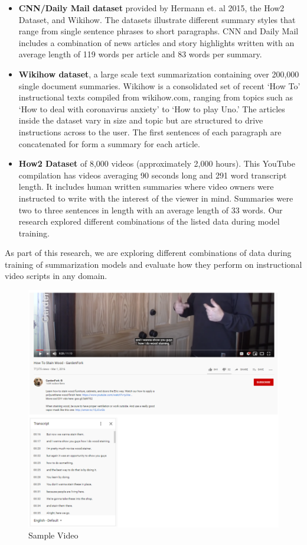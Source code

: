 \documentclass{article}
\begin{document}
\begin{itemize}

\item \textbf{CNN/Daily Mail dataset} provided by Hermann et. al 2015, the How2 Dataset, and Wikihow. The datasets illustrate different summary styles that range from single sentence phrases to short paragraphs. CNN and Daily Mail includes a combination of news articles and story highlights written with an average length of 119 words per article and 83 words per summary.
\item \textbf{Wikihow dataset}, a large scale text summarization containing over 200,000 single document summaries. Wikihow is a consolidated set of recent ‘How To’ instructional texts compiled from wikihow.com, ranging from topics such as ‘How to deal with coronavirus anxiety’ to ‘How to play Uno.’ The articles inside the dataset vary in size and topic but are structured to drive instructions across to the user. The first sentences of each paragraph are concatenated for form a summary for each article. 
\item \textbf{How2 Dataset} of 8,000 videos (approximately 2,000 hours). This YouTube compilation has videos averaging 90 seconds long and 291 word transcript length. It includes human written summaries where video owners were instructed to write with the interest of the viewer in mind. Summaries were two to three sentences in length with an average length of 33 words. 
Our research explored different combinations of the listed data during model training. 

\end{itemize}

As part of this research, we are exploring different combinations of data during training of summarization models and evaluate how they perform on  instructional video scripts in any domain.  

\begin{figure}
  \includegraphics[width=\linewidth]{samplevideo.png}
  \caption{Sample Video}
  \label{fig:samplevideo}
\end{figure}
\end{document}
